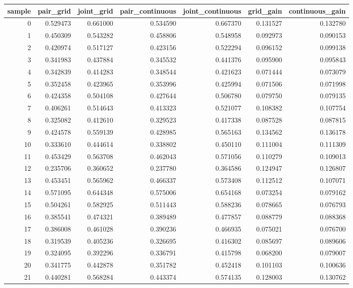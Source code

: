\begin{tabular}{rrrrrrr}
\toprule
sample & pair_grid & joint_grid & pair_continuous & joint_continuous & grid_gain & continuous_gain \\
\midrule
0 & 0.529473 & 0.661000 & 0.534590 & 0.667370 & 0.131527 & 0.132780 \\
1 & 0.450309 & 0.543282 & 0.458806 & 0.548958 & 0.092973 & 0.090153 \\
2 & 0.420974 & 0.517127 & 0.423156 & 0.522294 & 0.096152 & 0.099138 \\
3 & 0.341983 & 0.437884 & 0.345532 & 0.441376 & 0.095900 & 0.095843 \\
4 & 0.342839 & 0.414283 & 0.348544 & 0.421623 & 0.071444 & 0.073079 \\
5 & 0.352458 & 0.423965 & 0.353996 & 0.425994 & 0.071506 & 0.071998 \\
6 & 0.424358 & 0.504108 & 0.427644 & 0.506780 & 0.079750 & 0.079135 \\
7 & 0.406261 & 0.514643 & 0.413323 & 0.521077 & 0.108382 & 0.107754 \\
8 & 0.325082 & 0.412610 & 0.329523 & 0.417338 & 0.087528 & 0.087815 \\
9 & 0.424578 & 0.559139 & 0.428985 & 0.565163 & 0.134562 & 0.136178 \\
10 & 0.333610 & 0.444614 & 0.338802 & 0.450110 & 0.111004 & 0.111309 \\
11 & 0.453429 & 0.563708 & 0.462043 & 0.571056 & 0.110279 & 0.109013 \\
12 & 0.235706 & 0.360652 & 0.237780 & 0.364586 & 0.124947 & 0.126807 \\
13 & 0.453451 & 0.565962 & 0.466337 & 0.573408 & 0.112512 & 0.107071 \\
14 & 0.571095 & 0.644348 & 0.575006 & 0.654168 & 0.073254 & 0.079162 \\
15 & 0.504261 & 0.582925 & 0.511443 & 0.588236 & 0.078665 & 0.076793 \\
16 & 0.385541 & 0.474321 & 0.389489 & 0.477857 & 0.088779 & 0.088368 \\
17 & 0.386008 & 0.461028 & 0.390236 & 0.466935 & 0.075021 & 0.076700 \\
18 & 0.319539 & 0.405236 & 0.326695 & 0.416302 & 0.085697 & 0.089606 \\
19 & 0.324095 & 0.392296 & 0.336791 & 0.415798 & 0.068200 & 0.079007 \\
20 & 0.341775 & 0.442878 & 0.351782 & 0.452418 & 0.101103 & 0.100636 \\
21 & 0.440281 & 0.568284 & 0.443374 & 0.574135 & 0.128003 & 0.130762 \\

\end{tabular}

